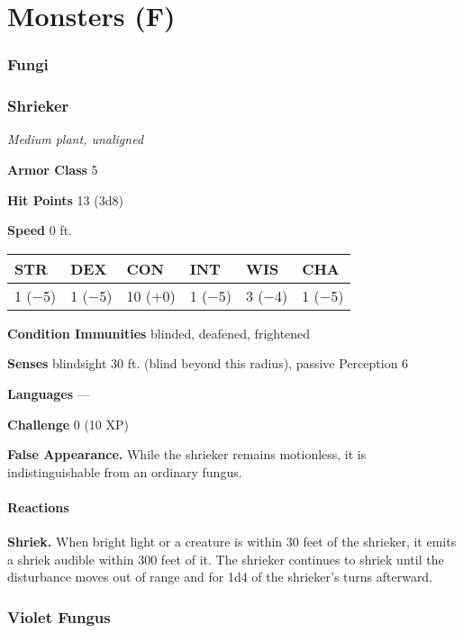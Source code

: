 \documentclass[
]{article}
\date{}
\begin{document}
\hypertarget{monsters-f}{%
\section{Monsters (F)}\label{monsters-f}}

\hypertarget{fungi}{%
\subsubsection{Fungi}\label{fungi}}

\hypertarget{shrieker}{%
\subsubsection{Shrieker}\label{shrieker}}

\emph{Medium plant, unaligned}

\textbf{Armor Class} 5

\textbf{Hit Points} 13 (3d8)

\textbf{Speed} 0 ft.

\begin{longtable}[]{@{}llllll@{}}
\toprule
STR & DEX & CON & INT & WIS & CHA\tabularnewline
\midrule
\endhead
1 (−5) & 1 (−5) & 10 (+0) & 1 (−5) & 3 (−4) & 1 (−5)\tabularnewline
\bottomrule
\end{longtable}

\textbf{Condition Immunities} blinded, deafened, frightened

\textbf{Senses} blindsight 30 ft. (blind beyond this radius), passive
Perception 6

\textbf{Languages} ---

\textbf{Challenge} 0 (10 XP)

\textbf{False Appearance.} While the shrieker remains motionless, it is
indistinguishable from an ordinary fungus.

\hypertarget{reactions}{%
\paragraph{Reactions}\label{reactions}}

\textbf{Shriek.} When bright light or a creature is within 30 feet of
the shrieker, it emits a shriek audible within 300 feet of it. The
shrieker continues to shriek until the disturbance moves out of range
and for 1d4 of the shrieker's turns afterward.

\hypertarget{violet-fungus}{%
\subsubsection{Violet Fungus}\label{violet-fungus}}
\end{document}
